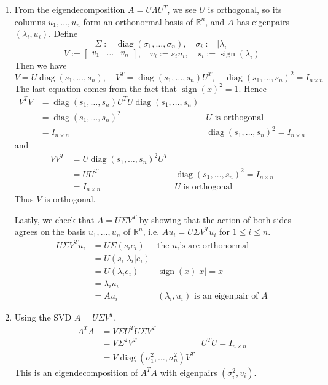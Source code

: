\documentclass{article}
\def\mbb#1{\mathbb{#1}}
\def\bR{\mbb{R}}
\newcommand{\m}[2][b]{\begin{#1matrix}#2\end{#1matrix}}
\DeclareMathOperator{\diag}{diag}
\renewcommand{\L}{\Lambda}
\renewcommand{\l}{\lambda}
\newcommand{\s}{\sigma}
\renewcommand{\S}{\Sigma}
\DeclareMathOperator{\sign}{sign}
\begin{document}
\begin{enumerate}
	\begin{enumerate}
		
		
		
		\item From the eigendecomposition $A=U\L U^T$, we see $U$ is orthogonal, so its columns $u_1,\dots,u_n$ form an orthonormal basis of $\bR^n$, and $A$ has eigenpairs $(\l_i,u_i)$. Define
		\[\S := \diag(\s_1,\dots,\s_n),
		\quad \s_i := |\l_i|\]
		\[V := \m{v_1 & \dots & v_n},
		\quad v_i := s_iu_i,
		\quad s_i := \sign(\l_i)\]
		Then we have
		\[V = U\diag(s_1,\dots,s_n),
		\quad V^T = \diag(s_1,\dots,s_n)U^T,
		\quad \diag(s_1,\dots,s_n)^2 = I_{n\times n}\]
		The last equation comes from the fact that $\sign(x)^2=1$. Hence
		\begin{align*}
			V^TV &= \diag(s_1,\dots,s_n)U^TU\diag(s_1,\dots,s_n) \\
			&= \diag(s_1,\dots,s_n)^2 & \text{$U$ is orthogonal} \\
			&= I_{n\times n} & \diag(s_1,\dots,s_n)^2 = I_{n\times n}
		\end{align*}
		and
		\begin{align*}
			VV^T &= U\diag(s_1,\dots,s_n)^2U^T \\
			&= UU^T & \diag(s_1,\dots,s_n)^2 = I_{n\times n} \\
			&= I_{n\times n} & \text{$U$ is orthogonal}
		\end{align*}
		Thus $V$ is orthogonal.
		
		Lastly, we check that $A=U\S V^T$ by showing that the action of both sides agrees on the basis $u_1,\dots,u_n$ of $\bR^n$, i.e. $Au_i=U\S V^Tu_i$ for $1\le i\le n$.
		\begin{align*}
			U\S V^Tu_i &= U\S(s_ie_i) & \text{the $u_i$'s are orthonormal} \\
			&= U(s_i|\l_i|e_i) \\
			&= U(\l_ie_i) & \sign(x)|x| = x \\
			&= \l_iu_i \\
			&= Au_i & \text{$(\l_i,u_i)$ is an eigenpair of $A$}
		\end{align*}
		
		
		
		\item Using the SVD $A=U\S V^T$,
		\begin{align*}
			A^TA &= V\S U^TU\S V^T \\
			&= V\S^2V^T & U^TU = I_{n\times n} \\
			&= V\diag(\s_1^2,\dots,\s_n^2)V^T
		\end{align*}
		This is an eigendecomposition of $A^TA$ with eigenpairs $(\s_i^2,v_i)$.
		

\end{enumerate}
\end{enumerate}
\end{document}
